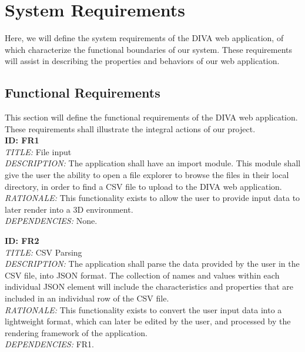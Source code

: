 \documentclass[journal,10pt,onecolumn,compsoc]{IEEEtran} \usepackage[margin=1.0in]{geometry} \usepackage{pdfpages}
\begin{document}
\section{System Requirements}
\noindent Here, we will define the system requirements of the DIVA web application, of which characterize the functional boundaries of our system. These requirements will assist in describing the properties and behaviors of our web application.

    \subsection{Functional Requirements}
    This section will define the functional requirements of the DIVA web application. These requirements shall illustrate the integral actions of our project. \\
    \newline
        \noindent \textbf{ID: FR1}\\
        \textit{TITLE:} File input\\
        \textit{DESCRIPTION:} The application shall have an import module. This module shall give the user the ability to open a file explorer to browse the files in their local directory, in order to find a CSV file to upload to the DIVA web application.\\
        \textit{RATIONALE:} This functionality exists to allow the user to provide input data to later render into a 3D environment.  \\
        \textit{DEPENDENCIES:} None.
        \newline
        
        \noindent \textbf{ID: FR2}\\
        \textit{TITLE:} CSV Parsing\\
        \textit{DESCRIPTION:} The application shall parse the data provided by the user in the CSV file, into JSON format. The collection of names and values within each individual JSON element will include the characteristics and properties that are included in an individual row of the CSV file.\\
        \textit{RATIONALE:} This functionality exists to convert the user input data into a lightweight format, which can later be edited by the user, and processed by the rendering framework of the application. \\
        \textit{DEPENDENCIES:} FR1.
        \newline
        
\end{document}
